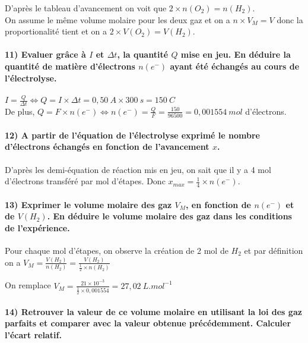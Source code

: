 \documentclass[a4paper, 12pt]{scrartcl}
\begin{document}
D'après le tableau d'avancement on voit que $2 \times n\left( O_2 \right) = n\left( H_2 \right)$.
\\
On assume le même volume molaire pour les deux gaz et on a $n \times V_M = V$ donc la proportionalité
tient et on a $2 \times V\left( O_2 \right) = V\left( H_2 \right)$.

\paragraph*{11) Evaluer grâce à $I$ et $\Delta t$, la quantité $Q$ mise en jeu. En déduire la quantité de matière d'électrons $n\left( e^- \right)$ ayant été 
échangés au cours de l'électrolyse. \\[5mm]}

$I = \frac{Q}{\Delta t} \iff Q = I \times \Delta t = 0,50\ \si{A} \times 300\ \si{s} = 150\ \si{C}$ \\[2mm]
De plus, $Q = F \times n\left( e^- \right) \iff n\left( e^- \right) = \frac{Q}{F} = \frac{150}{96500} = 0,001554\ \si{mol}$ d'électrons.

\paragraph*{12) A partir de l'équation de l'électrolyse exprimé le nombre d'électrons échangés en fonction de l'avancement $x$. \\[5mm]}

D'après les demi-équation de réaction mis en jeu, on sait que il y a 4 mol d'électrons transféré par mol d'étapes. Donc $x_{max} = \frac{1}{4} \times n\left( e^- \right)$.

\paragraph*{13) Exprimer le volume molaire des gaz $V_M$, en fonction de $n\left( e^- \right)$ et de $V\left( H_2 \right)$.
En déduire le volume molaire des gaz dans les conditions de l'expérience. \\[5mm]}

Pour chaque mol d'étapes, on observe la création de 2 mol de $H_2$ et par définition on a $V_M = \frac{V\left( H_2 \right)}{n\left( H_2 \right)} = \frac{V\left( H_2 \right)}{\frac{1}{2}\times n\left( H_2 \right)}$

On remplace $V_M = \frac{21\times 10^{-3}}{\frac{1}{2}\times 0,001554} = 27,02\ \si{L.mol^{-1}}$

\paragraph*{14) Retrouver la valeur de ce volume molaire en utilisant la loi des gaz parfaits et comparer avec la valeur obtenue précédemment. Calculer l'écart relatif. \\[5mm]}
\end{document}
